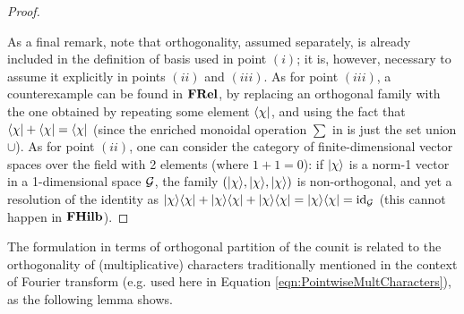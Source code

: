 \begin{proof}
\begin{itemize}
\end{itemize}

As a final remark, note that orthogonality, assumed separately, is already included in the definition of basis used in point $(i)$; it is, however, necessary to assume it explicitly in points $(ii)$ and $(iii)$. As for point $(iii)$, a counterexample can be found in $\mathbf{FRel}$, by replacing an orthogonal family with the one obtained by repeating some element $\langle \chi |$, and using the fact that $\langle \chi | + \langle \chi | = \langle \chi |$ (since the enriched monoidal operation $\sum$ in  is just the set union $\cup$). As for point $(ii)$, one can consider the category of finite-dimensional vector spaces over the field with 2 elements (where $1+1=0$): if $| \chi \rangle$ is a norm-1 vector in a 1-dimensional space $\mathcal{G}$, the family $(| \chi \rangle,| \chi \rangle,| \chi \rangle)$ is non-orthogonal, and yet a resolution of the identity as $| \chi \rangle\langle \chi |+| \chi \rangle\langle \chi |+| \chi \rangle\langle \chi | = | \chi \rangle\langle \chi | = \mbox{id}_{\mathcal{G}}$ (this cannot happen in $\mathbf{FHilb}$).
\end{proof}

The formulation in terms of orthogonal partition of the counit is related to the orthogonality of (multiplicative) characters traditionally mentioned in the context of Fourier transform (e.g. used here in Equation \ref{eqn:PointwiseMultCharacters}), as the following lemma shows. 

